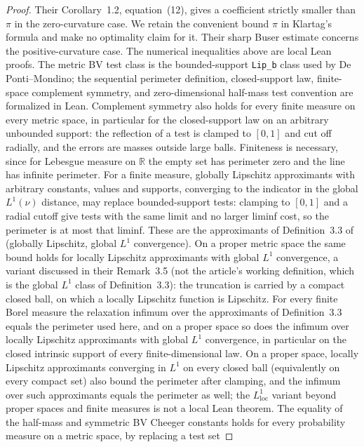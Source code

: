 \begin{proof}
  Their Corollary~1.2, equation~(12), gives
  a coefficient strictly smaller than $\pi$ in the zero-curvature case.
  We retain the convenient bound $\pi$ in Klartag's formula and make no optimality
  claim for it. Their sharp Buser estimate concerns the positive-curvature case.
  The numerical inequalities above are local Lean proofs. The metric BV test class
  is the bounded-support \texttt{Lip\_b} class used by De Ponti--Mondino; the
  sequential perimeter definition, closed-support law, finite-space complement
  symmetry, and zero-dimensional half-mass test convention are formalized in Lean.
  Complement symmetry also holds for every finite measure on every metric
  space, in particular for the closed-support law on an arbitrary unbounded support:
  the reflection of a test is clamped to $[0,1]$ and cut off radially, and the
  errors are masses outside large balls. Finiteness is necessary, since for Lebesgue measure on
  $\mathbb R$ the empty set has perimeter zero and the line has infinite perimeter. For a
  finite measure, globally Lipschitz approximants with arbitrary constants, values and supports,
  converging to the indicator in the global $L^1(\nu)$ distance, may replace bounded-support
  tests: clamping to $[0,1]$ and a radial cutoff give tests with the same limit and no larger
  liminf cost, so the perimeter is at most that liminf. These are the approximants
  of Definition~3.3 of \cite{AmbrosioDiMarinoGigli2017Minkowski} (globally Lipschitz, global
  $L^1$ convergence). On a proper metric space the same bound holds for locally Lipschitz
  approximants with global $L^1$ convergence, a variant discussed in their Remark~3.5
  (not the article's working definition, which is the global $L^1$ class of Definition~3.3): the
  truncation is carried by a compact closed ball, on which a locally Lipschitz function is
  Lipschitz. For every finite Borel measure the relaxation infimum over the approximants of
  Definition~3.3 equals the perimeter used here, and on a proper space so does the infimum over
  locally Lipschitz approximants with global $L^1$ convergence, in particular on the closed
  intrinsic support of every finite-dimensional law. On a proper space, locally Lipschitz approximants
  converging in $L^1$ on every closed ball (equivalently on every compact set) also bound the
  perimeter after clamping, and the infimum over such approximants equals the perimeter
  as well; the $L^1_{\mathrm{loc}}$ variant beyond proper spaces
  and finite measures is not a local Lean theorem. The equality of the half-mass and symmetric BV Cheeger constants
  holds for every probability measure on a metric space, by replacing a test set

\end{proof}
